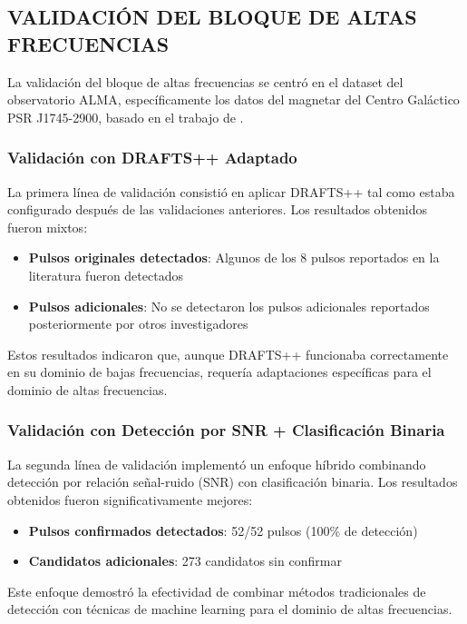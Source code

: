 \subsection{VALIDACIÓN DEL BLOQUE DE ALTAS FRECUENCIAS}

La validación del bloque de altas frecuencias se centró en el dataset del observatorio ALMA, específicamente los datos del magnetar del Centro Galáctico PSR J1745-2900, basado en el trabajo de \cite{veracasanova2025}.

\subsubsection{Validación con DRAFTS++ Adaptado}

La primera línea de validación consistió en aplicar DRAFTS++ tal como estaba configurado después de las validaciones anteriores. Los resultados obtenidos fueron mixtos:

\begin{itemize}
    \item \textbf{Pulsos originales detectados}: Algunos de los 8 pulsos reportados en la literatura fueron detectados
    \item \textbf{Pulsos adicionales}: No se detectaron los pulsos adicionales reportados posteriormente por otros investigadores
\end{itemize}

Estos resultados indicaron que, aunque DRAFTS++ funcionaba correctamente en su dominio de bajas frecuencias, requería adaptaciones específicas para el dominio de altas frecuencias.

\subsubsection{Validación con Detección por SNR + Clasificación Binaria}

La segunda línea de validación implementó un enfoque híbrido combinando detección por relación señal-ruido (SNR) con clasificación binaria. Los resultados obtenidos fueron significativamente mejores:

\begin{itemize}
    \item \textbf{Pulsos confirmados detectados}: 52/52 pulsos (100\% de detección)
    \item \textbf{Candidatos adicionales}: 273 candidatos sin confirmar
\end{itemize}

Este enfoque demostró la efectividad de combinar métodos tradicionales de detección con técnicas de machine learning para el dominio de altas frecuencias.

